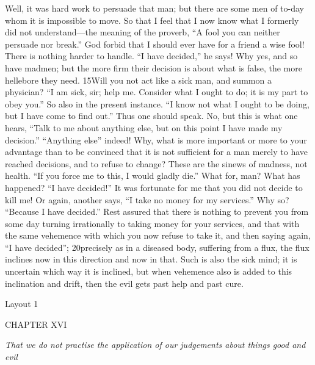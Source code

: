 Well, it was hard work to persuade that man; but there are some men of to-day whom it is impossible to move. So that I feel that I now know what I formerly did not understand—the meaning of the proverb, ``A fool you can neither persuade nor break.'' God forbid that I should ever have for a friend a wise fool! There is nothing harder to handle. ``I have decided,'' he says! Why yes, and so have madmen; but the more firm their decision is about what is false, the more hellebore they need. 15Will you not act like a sick man, and summon a physician? ``I am sick, sir; help me. Consider what I ought to do; it is my part to obey you.'' So also in the present instance. ``I know not what I ought to be doing, but I have come to find out.'' Thus one should speak. No, but this is what one hears, ``Talk to me about anything else, but on this point I have made my decision.'' ``Anything else'' indeed! Why, what is more important or more to your advantage than to be convinced that it is not sufficient for a man merely to have reached decisions, and to refuse to change? These are the sinews of madness, not health. ``If you force me to this, I would gladly die.'' What for, man? What has happened? ``I have decided!'' It was fortunate for me that you did not decide to kill me! Or again, another says, ``I take no money for my services.'' Why so? ``Because I have decided.'' Rest assured that there is nothing to prevent you from some day turning irrationally to taking money for your services, and that with the same vehemence with which you now refuse to take it, and then saying again, ``I have decided''; 20precisely as in a diseased body, suffering from a flux, the flux inclines now in this direction and now in that. Such is also the sick mind; it is uncertain which way it is inclined, but when vehemence also is added to this inclination and drift, then the evil gets past help and past cure.



Layout 1

CHAPTER XVI

\emph{That we do not practise the application of our judgements about things good and evil}

